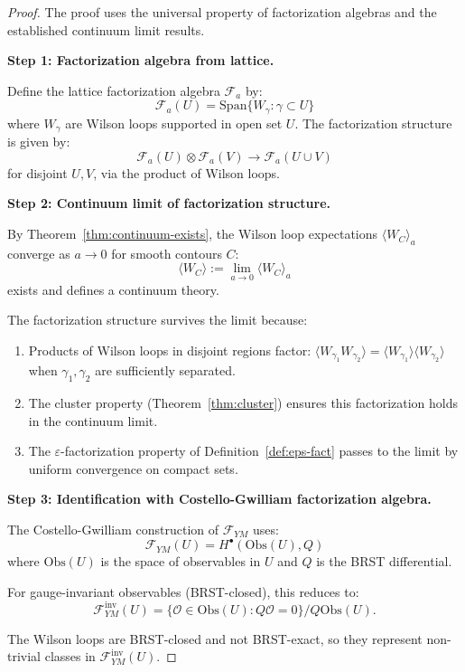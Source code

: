 \begin{proof}
The proof uses the universal property of factorization algebras and the 
established continuum limit results.

\textbf{Step 1: Factorization algebra from lattice.}

Define the lattice factorization algebra $\mathcal{F}_a$ by:
\[
\mathcal{F}_a(U) = \text{Span}\{W_\gamma : \gamma \subset U\}
\]
where $W_\gamma$ are Wilson loops supported in open set $U$. The factorization 
structure is given by:
\[
\mathcal{F}_a(U) \otimes \mathcal{F}_a(V) \to \mathcal{F}_a(U \cup V)
\]
for disjoint $U, V$, via the product of Wilson loops.

\textbf{Step 2: Continuum limit of factorization structure.}

By Theorem~\ref{thm:continuum-exists}, the Wilson loop expectations 
$\langle W_C \rangle_a$ converge as $a \to 0$ for smooth contours $C$:
\[
\langle W_C \rangle := \lim_{a \to 0} \langle W_C \rangle_a
\]
exists and defines a continuum theory.

The factorization structure survives the limit because:
\begin{enumerate}
\item Products of Wilson loops in disjoint regions factor: 
$\langle W_{\gamma_1} W_{\gamma_2} \rangle = \langle W_{\gamma_1} \rangle 
\langle W_{\gamma_2} \rangle$ when $\gamma_1, \gamma_2$ are sufficiently separated.

\item The cluster property (Theorem~\ref{thm:cluster}) ensures this factorization 
holds in the continuum limit.

\item The $\varepsilon$-factorization property of Definition~\ref{def:eps-fact} 
passes to the limit by uniform convergence on compact sets.
\end{enumerate}

\textbf{Step 3: Identification with Costello-Gwilliam factorization algebra.}

The Costello-Gwilliam construction of $\mathcal{F}_{YM}$ uses:
\[
\mathcal{F}_{YM}(U) = H^\bullet(\text{Obs}(U), Q)
\]
where $\text{Obs}(U)$ is the space of observables in $U$ and $Q$ is the 
BRST differential.

For gauge-invariant observables (BRST-closed), this reduces to:
\[
\mathcal{F}_{YM}^{\text{inv}}(U) = \{\mathcal{O} \in \text{Obs}(U) : Q\mathcal{O} = 0\}/Q\text{Obs}(U).
\]

The Wilson loops are BRST-closed and not BRST-exact, so they represent 
non-trivial classes in $\mathcal{F}_{YM}^{\text{inv}}(U)$.


\end{proof}
